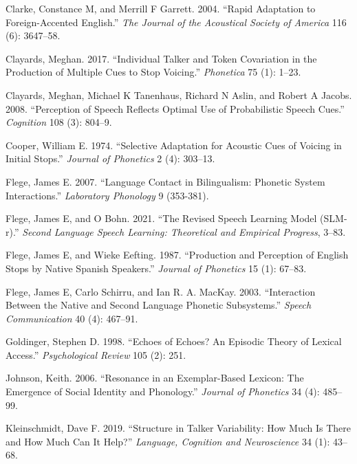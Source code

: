 \documentclass[
  preprint]{elsarticle}
\newlength{\cslhangindent}
\newlength{\cslentryspacingunit} %
\newenvironment{CSLReferences}[2] %
 {%
  \setlength{\parindent}{0pt}
  \ifodd #1
  \let\oldpar\par
  \def\par{\hangindent=\cslhangindent\oldpar}
  \fi
  \setlength{\parskip}{#2\cslentryspacingunit}
 }%
 {}
\begin{document}
\begin{CSLReferences}{1}{0}
\leavevmode{}%
Clarke, Constance M, and Merrill F Garrett. 2004. {``Rapid Adaptation to Foreign-Accented {English}.''} \emph{The Journal of the Acoustical Society of America} 116 (6): 3647--58.

\leavevmode{}%
Clayards, Meghan. 2017. {``Individual Talker and Token Covariation in the Production of Multiple Cues to Stop Voicing.''} \emph{Phonetica} 75 (1): 1--23.

\leavevmode{}%
Clayards, Meghan, Michael K Tanenhaus, Richard N Aslin, and Robert A Jacobs. 2008. {``Perception of Speech Reflects Optimal Use of Probabilistic Speech Cues.''} \emph{Cognition} 108 (3): 804--9.

\leavevmode{}%
Cooper, William E. 1974. {``Selective Adaptation for Acoustic Cues of Voicing in Initial Stops.''} \emph{Journal of Phonetics} 2 (4): 303--13.

\leavevmode{}%
Flege, James E. 2007. {``Language Contact in Bilingualism: Phonetic System Interactions.''} \emph{Laboratory Phonology} 9 (353-381).

\leavevmode{}%
Flege, James E, and O Bohn. 2021. {``The Revised Speech Learning Model (SLM-r).''} \emph{Second Language Speech Learning: Theoretical and Empirical Progress}, 3--83.

\leavevmode{}%
Flege, James E, and Wieke Eefting. 1987. {``Production and Perception of English Stops by Native Spanish Speakers.''} \emph{Journal of Phonetics} 15 (1): 67--83.

\leavevmode{}%
Flege, James E, Carlo Schirru, and Ian R. A. MacKay. 2003. {``Interaction Between the Native and Second Language Phonetic Subsystems.''} \emph{Speech Communication} 40 (4): 467--91.

\leavevmode{}%
Goldinger, Stephen D. 1998. {``Echoes of Echoes? An Episodic Theory of Lexical Access.''} \emph{Psychological Review} 105 (2): 251.

\leavevmode{}%
Johnson, Keith. 2006. {``Resonance in an Exemplar-Based Lexicon: The Emergence of Social Identity and Phonology.''} \emph{Journal of Phonetics} 34 (4): 485--99.

\leavevmode{}%
Kleinschmidt, Dave F. 2019. {``Structure in Talker Variability: How Much Is There and How Much Can It Help?''} \emph{Language, Cognition and Neuroscience} 34 (1): 43--68.


\end{CSLReferences}
\end{document}

